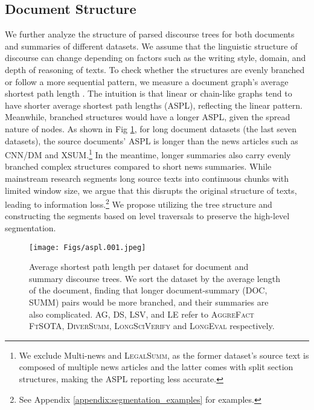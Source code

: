 


\subsection{Document Structure}\label{sec:document_structure}
 We further analyze the structure of parsed discourse trees for both documents and summaries of different datasets. We assume that the linguistic structure of discourse can change depending on factors such as the writing style, domain, and depth of reasoning of texts. To check whether the
structures are evenly branched or follow a more sequential pattern, we measure a document graph's average shortest path length \cite{kim2024threads}. The intuition is that linear or chain-like graphs tend to have shorter average shortest path lengths (ASPL), reflecting the linear pattern. Meanwhile, branched structures would have a longer ASPL, given the spread nature of nodes. As shown in Fig \ref{fig:aspl_fig}, for long document datasets (the last seven datasets), the source documents' ASPL is longer than the news articles such as CNN/DM and XSUM.\footnote{We exclude Multi-news and \textsc{LegalSumm}, as the former dataset's source text is composed of multiple news articles and the latter comes with split section structures, making the ASPL reporting less accurate.} In the meantime, longer summaries also carry evenly branched complex structures compared to short news summaries. While mainstream research segments long source texts into continuous chunks with limited window size, we argue that this disrupts the original structure of texts, leading to information loss.\footnote{See Appendix \ref{appendix:segmentation_examples} for examples.} We propose utilizing the tree structure and constructing the segments based on level traversals to preserve the high-level segmentation. 

\begin{figure}
    \centering
    \texttt{[image: Figs/aspl.001.jpeg]}
    \caption{Average shortest path length per dataset for document and summary discourse trees. We sort the dataset by the average length of the document, finding that longer document-summary (DOC, SUMM) pairs would be more branched, and their summaries are also complicated. AG, DS, LSV, and LE refer to \textsc{AggreFact FtSOTA}, \textsc{DiverSumm}, \textsc{LongSciVerify} and \textsc{LongEval} respectively.}
    \label{fig:aspl_fig}
\end{figure}
